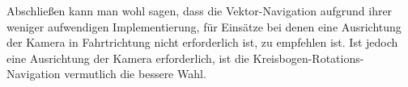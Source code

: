 Abschließen kann man wohl sagen, dass die Vektor-Navigation aufgrund ihrer
weniger aufwendigen Implementierung, für Einsätze bei denen eine Ausrichtung der
Kamera in Fahrtrichtung nicht erforderlich ist, zu empfehlen ist. Ist jedoch
eine Ausrichtung der Kamera erforderlich, ist die
Kreisbogen-Rotations-Navigation vermutlich die bessere Wahl.


